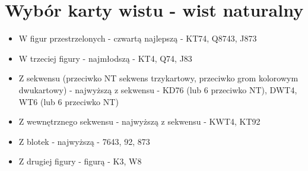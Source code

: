\documentclass{article}
\begin{document}
    \section{Wybór karty wistu - wist naturalny}
    	\begin{itemize}
    	\item W figur przestrzelonych - czwartą najlepszą - KT7{\color{red}4}, Q87{\color{red}4}3, J87{\color{red}3}
    	\item W trzeciej figury - najmłodszą - KT{\color{red}4}, Q7{\color{red}4}, J8{\color{red}3}
    	\item Z sekwensu (przeciwko NT sekwens trzykartowy, przeciwko grom kolorowym dwukartowy) - najwyższą z sekwensu - {\color{red}K}D76 (lub 6 przeciwko NT), {\color{red}D}WT4, {\color{red}W}T6 (lub 6 przeciwko NT)
    	\item Z wewnętrznego sekwensu - najwyższą z sekwensu - K{\color{red}W}T4, K{\color{red}T}92
    	\item Z blotek - najwyższą - {\color{red}7}643, {\color{red}9}2, {\color{red}8}73
    	\item Z drugiej figury - figurą - {\color{red}K}3, {\color{red}W}8
    	\end{itemize}
\end{document}
